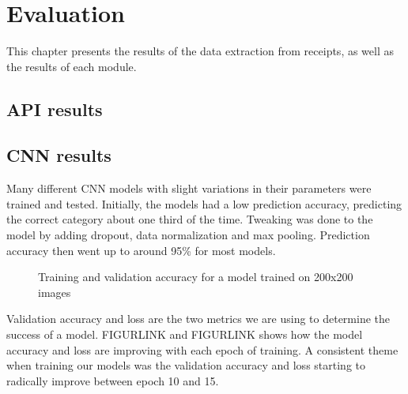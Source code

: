 \chapter{Evaluation}
\label{ch:evaluation}
This chapter presents the results of the data extraction from receipts, as well as the results of each module.

\section{API results}


\section{CNN results}
Many different CNN models with slight variations in their parameters were trained and tested.
Initially, the models had a low prediction accuracy, predicting the correct category about one third of the time.
Tweaking was done to the model by adding dropout, data normalization and max pooling.
Prediction accuracy then went up to around 95\% for most models.

\begin{figure}[h]
    \caption{Training and validation accuracy for a model trained on 200x200 images}
    \label{fig:figure3.2}
\end{figure}

Validation accuracy and loss are the two metrics we are using to determine the success of a model.
FIGURLINK and FIGURLINK shows how the model accuracy and loss are improving with each epoch of training.
A consistent theme when training our models was the validation accuracy and loss starting to radically improve between epoch 10 and 15.

